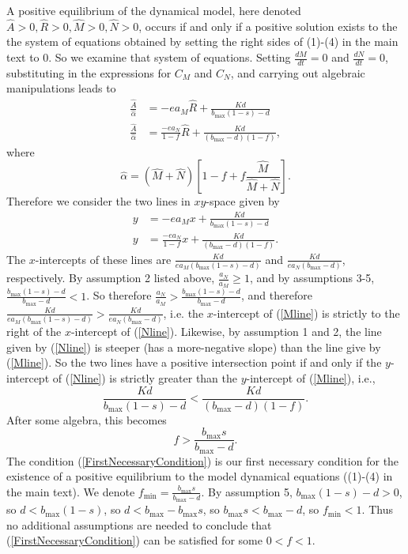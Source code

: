 \documentclass[letterpaper,11pt]{article}
\newcommand{\hA}{\hat{A}}
\newcommand{\hR}{\hat{R}}
\newcommand{\hM}{\hat{M}}
\newcommand{\hN}{\hat{N}}
\newcommand{\halph}{\hat{\alpha}}
\newcommand{\bmax}{b_{\text{max}}}
\newcommand{\fmin}{f_{\text{min}}}
\begin{document}
\noindent A positive equilibrium of the dynamical model, here denoted $\hA>0,\hR>0,\hM>0,\hN>0$, occurs if and only if
a positive solution exists to the the system of equations obtained by setting the right sides of (1)-(4)
in the main text to $0$. So we examine that system of equations. 
Setting $\frac{dM}{dt}=0$ and $\frac{dN}{dt}=0$, substituting in the expressions for $C_M$ and $C_N$, and carrying out
algebraic manipulations leads to
\begin{align}
\frac{\hA}{\halph} &= -ea_M \hR +\frac{Kd}{\bmax (1-s)-d} \\
\frac{\hA}{\halph} &= \frac{-ea_N}{1-f}\hR +\frac{Kd}{(\bmax-d)(1-f)},
\end{align}
where
\begin{equation}
\halph=(\hM+\hN)\left[1-f+f\frac{\hM}{\hM+\hN} \right].
\end{equation}
Therefore we consider the two lines in $xy$-space given by
\begin{align}
y &= -ea_M x +\frac{Kd}{\bmax (1-s)-d} \label{Mline}\\
y &= \frac{-ea_N}{1-f}x +\frac{Kd}{(\bmax-d)(1-f)}. \label{Nline}
\end{align}
The $x$-intercepts of these lines are $\frac{Kd}{ea_M(\bmax(1-s)-d)}$ and
$\frac{Kd}{ea_N(\bmax-d)}$, respectively. By assumption 2 listed above, $\frac{a_N}{a_M}\geq1$, and by assumptions 3-5,
$\frac{\bmax(1-s)-d}{\bmax-d}<1$. So therefore $\frac{a_N}{a_M}>\frac{\bmax(1-s)-d}{\bmax-d}$, and
therefore $\frac{Kd}{ea_M(\bmax(1-s)-d)}>\frac{Kd}{ea_N(\bmax-d)}$, i.e. the $x$-intercept of (\ref{Mline})
is strictly to the right of the $x$-intercept of (\ref{Nline}). Likewise, by assumption 1 and 2, the line given by
(\ref{Nline}) is steeper (has a more-negative slope) than the line give by (\ref{Mline}). So the two lines have a
positive intersection point if and only if the $y$-intercept of (\ref{Nline}) is strictly greater than the
$y$-intercept of (\ref{Mline}), i.e.,
\begin{equation}
\frac{Kd}{\bmax(1-s)-d}<\frac{Kd}{(\bmax-d)(1-f)}.
\end{equation}
After some algebra, this becomes
\begin{equation}
f>\frac{\bmax s}{\bmax-d}.\label{FirstNecessaryCondition}
\end{equation}
The condition (\ref{FirstNecessaryCondition}) is our first necessary condition for the existence of a positive equilibrium to
the model dynamical equations ((1)-(4) in the main text). We denote $\fmin=\frac{\bmax s}{\bmax-d}$. By assumption 5,
$\bmax(1-s)-d>0$, so $d<\bmax(1-s)$, so $d<\bmax-\bmax s$, so $\bmax s < \bmax - d$, so $\fmin<1$. Thus no additional assumptions
are needed to conclude that (\ref{FirstNecessaryCondition}) can be satisfied for some $0<f<1$.
\end{document}
